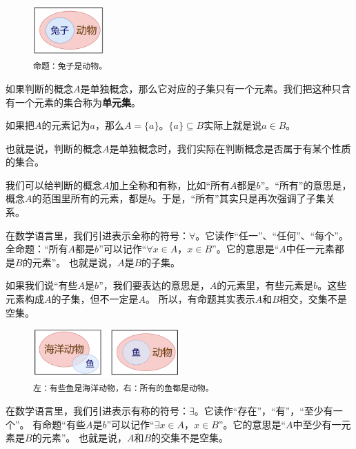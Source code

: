 \documentclass[12pt,UTF8]{ctexbook}
\begin{document}
\begin{figure} %
    \vspace{-32pt}
    \flushright
    \includegraphics[width=0.24\textwidth]{tu/判断和集合1.png}
    \caption*{\texttt{命题：兔子是动物。}}
\end{figure}

如果判断的概念$A$是单独概念，那么它对应的子集只有一个元素。我们把这种只含有一个元素的集合称为\textbf{单元集}。

如果把$A$的元素记为$a$，那么$A = \{a\}$。$\{a\} \subseteq B$实际上就是说$a\in B$。

也就是说，判断的概念$A$是单独概念时，我们实际在判断概念是否属于有某个性质的集合。

我们可以给判断的概念$A$加上全称和有称，比如“所有$A$都是$b$”。“所有”的意思是，
概念$A$的范围里所有的元素，都是$b$。于是，“所有”其实只是再次强调了子集关系。

在数学语言里，我们引进表示全称的符号：$\forall$。它读作“任一”、“任何”、“每个”。
全命题：“所有$A$都是$b$”可以记作“$\forall x \in A$，$x \in B$”。它的意思是“$A$中任一元素都是$B$的元素”。
也就是说，$A$是$B$的子集。

如果我们说“有些$A$是$b$”，我们要表达的意思是，$A$的元素里，有些元素是$b$。这些元素构成$A$的子集，但不一定是$A$。
所以，有命题其实表示$A$和$B$相交，交集不是空集。

\begin{figure}[h]
    \vspace{4pt}
    \centering
    \includegraphics[width=0.5\textwidth]{tu/判断和集合2.png}
    \captionsetup{justification=centering}
    \caption*{\texttt{左：有些鱼是海洋动物，右：所有的鱼都是动物。}}
\end{figure}

在数学语言里，我们引进表示有称的符号：$\exists$。它读作“存在”，“有”，“至少有一个”。
有命题“有些$A$是$b$”可以记作“$\exists x \in A$，$x \in B$”。它的意思是“$A$中至少有一元素是$B$的元素”。
也就是说，$A$和$B$的交集不是空集。
\end{document}
